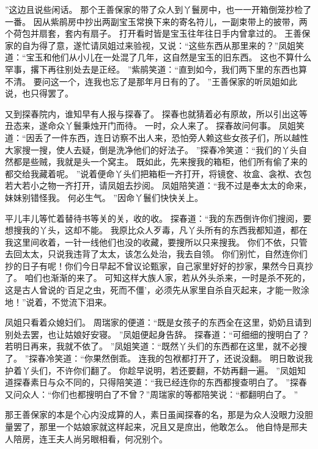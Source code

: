 ”这边且说些闲话。
那个王善保家的带了众人到丫鬟房中，也一一开箱倒笼抄检了一番。
因从紫鹃房中抄出两副宝玉常换下来的寄名符儿，一副束带上的披带，两个荷包并扇套，套内有扇子。
打开看时皆是宝玉往年往日手内曾拿过的。
王善保家的自为得了意，遂忙请凤姐过来验视，又说：“这些东西从那里来的？”凤姐笑道：“宝玉和他们从小儿在一处混了几年，这自然是宝玉的旧东西。
这也不算什么罕事，撂下再往别处去是正经。
”紫鹃笑道：“直到如今，我们两下里的东西也算不清。
要问这一个，连我也忘了是那年月日有的了。
”王善保家的听凤姐如此说，也只得罢了。
\par
又到探春院内，谁知早有人报与探春了。
探春也就猜着必有原故，所以引出这等丑态来，遂命众丫鬟秉烛开门而待。
一时，众人来了。
探春故问何事。
凤姐笑道：“因丢了一件东西，连日访察不出人来，恐怕旁人赖这些女孩子们，所以越性大家搜一搜，使人去疑，倒是洗净他们的好法子。
”探春冷笑道：“我们的丫头自然都是些贼，我就是头一个窝主。
既如此，先来搜我的箱柜，他们所有偷了来的都交给我藏着呢。
”说着便命丫头们把箱柜一齐打开，将镜奁、妆盒、衾袱、衣包若大若小之物一齐打开，请凤姐去抄阅。
凤姐陪笑道：“我不过是奉太太的命来，妹妹别错怪我。
何必生气。
”因命丫鬟们快快关上。
\par
平儿丰儿等忙着替待书等关的关，收的收。
探春道：“我的东西倒许你们搜阅，要想搜我的丫头，这却不能。
我原比众人歹毒，凡丫头所有的东西我都知道，都在我这里间收着，一针一线他们也没的收藏，要搜所以只来搜我。
你们不依，只管去回太太，只说我违背了太太，该怎么处治，我去自领。
你们别忙，自然连你们抄的日子有呢！你们今日早起不曾议论甄家，自己家里好好的抄家，果然今日真抄了。
咱们也渐渐的来了。
可知这样大族人家，若从外头杀来，一时是杀不死的，这是古人曾说的‘百足之虫，死而不僵’，必须先从家里自杀自灭起来，才能一败涂地！”说着，不觉流下泪来。
\par
凤姐只看着众媳妇们。
周瑞家的便道：“既是女孩子的东西全在这里，奶奶且请到别处去罢，也让姑娘好安寝。
”凤姐便起身告辞。
探春道：“可细细的搜明白了？若明日再来，我就不依了。
”凤姐笑道：“既然丫头们的东西都在这里，就不必搜了。
”探春冷笑道：“你果然倒乖。
连我的包袱都打开了，还说没翻。
明日敢说我护着丫头们，不许你们翻了。
你趁早说明，若还要翻，不妨再翻一遍。
”凤姐知道探春素日与众不同的，只得陪笑道：“我已经连你的东西都搜查明白了。
”探春又问众人：“你们也都搜明白了不曾？”周瑞家的等都陪笑说：“都翻明白了。
”\par
那王善保家的本是个心内没成算的人，素日虽闻探春的名，那是为众人没眼力没胆量罢了，那里一个姑娘家就这样起来，况且又是庶出，他敢怎么。
他自恃是邢夫人陪房，连王夫人尚另眼相看，何况别个。

